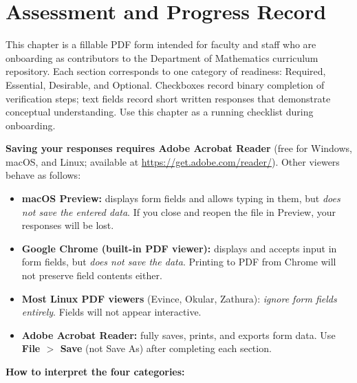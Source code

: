 \chapter{Assessment and Progress Record}
\label{ch:assessment}

\begin{Form}

This chapter is a fillable PDF form intended for faculty and staff
who are onboarding as contributors to the Department of Mathematics
curriculum repository. Each section corresponds to one category of
readiness: Required, Essential, Desirable, and Optional. Checkboxes
record binary completion of verification steps; text fields record
short written responses that demonstrate conceptual understanding.
Use this chapter as a running checklist during onboarding.

\vs
\noindent
\textbf{Saving your responses requires Adobe Acrobat Reader} (free
for Windows, macOS, and Linux; available at
\url{https://get.adobe.com/reader/}). Other viewers behave as
follows:

\begin{itemize}
    \item \textbf{macOS Preview:} displays form fields and allows
          typing in them, but \emph{does not save the entered data}.
          If you close and reopen the file in Preview, your responses
          will be lost.
    \item \textbf{Google Chrome (built-in PDF viewer):} displays and
          accepts input in form fields, but \emph{does not save the
          data}. Printing to PDF from Chrome will not preserve field
          contents either.
    \item \textbf{Most Linux PDF viewers} (Evince, Okular, Zathura):
          \emph{ignore form fields entirely}. Fields will not appear
          interactive.
    \item \textbf{Adobe Acrobat Reader:} fully saves, prints, and
          exports form data. Use \textbf{File $>$ Save} (not Save As)
          after completing each section.
\end{itemize}

\vs
\noindent
\textbf{How to interpret the four categories:}


\end{Form}
